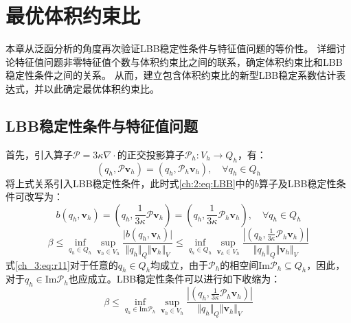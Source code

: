 \chapter{最优体积约束比}\label{LBB}
本章从泛函分析的角度再次验证LBB稳定性条件与特征值问题的等价性。
详细讨论特征值问题非零特征值个数与体积约束比之间的联系，确定体积约束比和LBB稳定性条件之间的关系。
从而，建立包含体积约束比的新型LBB稳定系数估计表达式，并以此确定最优体积约束比。

\section{LBB稳定性条件与特征值问题}

首先，引入算子$\mathcal P=3\kappa\nabla\cdot$的正交投影算子$\mathcal P_h:V_h \rightarrow Q_h$，有：
\begin{equation}\label{ch_3:eq:Ph}
    (q_h, \mathcal P \boldsymbol v_h) = (q_h, \mathcal P_h \boldsymbol v_h), \quad \forall q_h \in Q_h
\end{equation}
将上式关系引入LBB稳定性条件，此时式\eqref{ch:2:eq:LBB}中的$b$算子及LBB稳定性条件可改写为：
\begin{equation}\label{ch_3:eq:b}
    b(q_h,\boldsymbol v_h) = \left (q_h, \frac{1}{3\kappa}\mathcal P \boldsymbol v_h \right ) = \left (q_h, \frac{1}{3\kappa}\mathcal P_h \boldsymbol v_h \right ), \quad \forall q_h \in Q_h
\end{equation}
\begin{equation} \label{ch_3:eq:r11}
    \beta \le \inf_{q_h \in Q_h} \sup_{\boldsymbol v_h \in V_h} \frac{\vert b(q_h,\boldsymbol v_h) \vert}{\Vert q_h \Vert_Q \Vert \boldsymbol v_h \Vert_V} 
    \le \inf_{q_h \in Q_h} \sup_{\boldsymbol v_h \in V_h} \frac{\left \vert \left (q_h,\frac{1}{3\kappa}\mathcal P_h \boldsymbol v_h\right ) \right \vert}{\Vert q_h \Vert_Q \Vert \boldsymbol v_h \Vert_V}
\end{equation}
式\eqref{ch_3:eq:r11}对于任意的$q_h \in Q_h$均成立，由于$\mathcal P_h$的相空间$\mathrm{Im}\mathcal P_h \subseteq Q_h$，因此，对于$q_h \in \mathrm{Im}\mathcal P_h$也应成立。LBB稳定性条件可以进行如下收缩为：
\begin{equation} \label{ch_3:eq:r12}
        \beta \le \inf_{q_h \in \mathrm{Im}\mathcal P_h} \sup_{\boldsymbol v_h \in V_h} \frac{\left \vert \left (q_h,\frac{1}{3\kappa}\mathcal P_h \boldsymbol v_h \right )\right \vert}{\Vert q_h \Vert_Q \Vert \boldsymbol v_h \Vert_V}
\end{equation}


